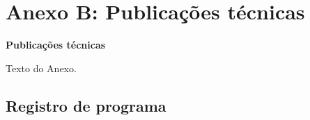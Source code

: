 \chapter{Anexo B: Publicações técnicas}
\label{an:b}
\begin{center}
    \textbf{Publicações técnicas}
\end{center}

Texto do Anexo.


\section{Registro de programa}
